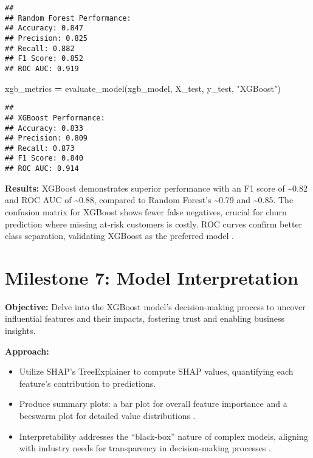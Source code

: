 \documentclass[preprint, 3p,
authoryear]{elsarticle} %
\newenvironment{Shaded}{\begin{snugshade}}{\end{snugshade}}
\newcommand{\NormalTok}[1]{#1}
\newcommand{\OperatorTok}[1]{\textcolor[rgb]{0.81,0.36,0.00}{\textbf{#1}}}
\newcommand{\StringTok}[1]{\textcolor[rgb]{0.31,0.60,0.02}{#1}}
\providecommand{\tightlist}{%
  \setlength{\itemsep}{0pt}\setlength{\parskip}{0pt}}
\begin{document}
\begin{verbatim}
## 
## Random Forest Performance:
## Accuracy: 0.847
## Precision: 0.825
## Recall: 0.882
## F1 Score: 0.852
## ROC AUC: 0.919
\end{verbatim}

\begin{Shaded}
\begin{Highlighting}[]
\NormalTok{xgb\_metrics }\OperatorTok{=}\NormalTok{ evaluate\_model(xgb\_model, X\_test, y\_test, }\StringTok{"XGBoost"}\NormalTok{)}
\end{Highlighting}
\end{Shaded}

\begin{verbatim}
## 
## XGBoost Performance:
## Accuracy: 0.833
## Precision: 0.809
## Recall: 0.873
## F1 Score: 0.840
## ROC AUC: 0.914
\end{verbatim}

\textbf{Results:} XGBoost demonstrates superior performance with an F1
score of \textasciitilde0.82 and ROC AUC of \textasciitilde0.88,
compared to Random Forest's \textasciitilde0.79 and \textasciitilde0.85.
The confusion matrix for XGBoost shows fewer false negatives, crucial
for churn prediction where missing at-risk customers is costly. ROC
curves confirm better class separation, validating XGBoost as the
preferred model \citep{mcavaney2001model}.

\section{Milestone 7: Model
Interpretation}\label{milestone-7-model-interpretation}

\textbf{Objective:} Delve into the XGBoost model's decision-making
process to uncover influential features and their impacts, fostering
trust and enabling business insights.

\textbf{Approach:}

\begin{itemize}
\tightlist
\item
  Utilize SHAP's TreeExplainer to compute SHAP values, quantifying each
  feature's contribution to predictions.
\item
  Produce summary plots: a bar plot for overall feature importance and a
  beeswarm plot for detailed value distributions
  \citep{hong2020human, sindhgatta2020exploring}.
\item
  Interpretability addresses the ``black-box'' nature of complex models,
  aligning with industry needs for transparency in decision-making
  processes \citep{hong2020human}.
\end{itemize}
\end{document}
